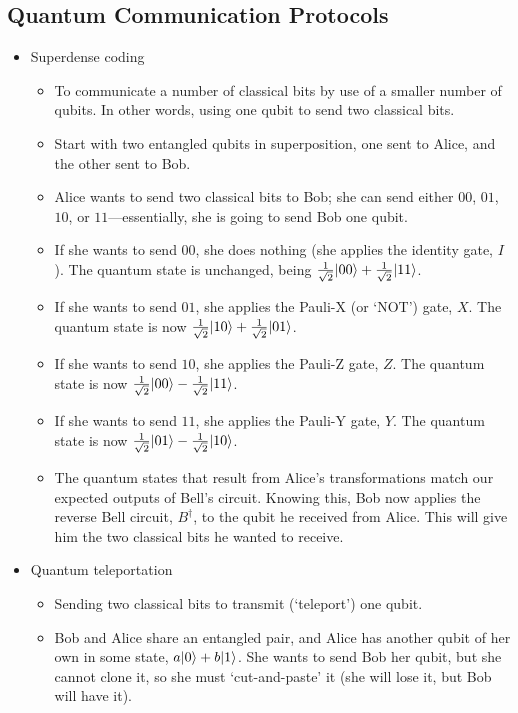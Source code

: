 \subsection{Quantum Communication Protocols}
\label{sub_sec:quantum_communication_protocols}
\begin{itemize}
    \item Superdense coding
        \begin{itemize}
            \item To communicate a number of classical bits by use of a smaller number of qubits. In other words, using one qubit to send two classical bits.
            \item Start with two entangled qubits in superposition, one sent to Alice, and the other sent to Bob.
            \item Alice wants to send two classical bits to Bob; she can send either $00$, $01$, $10$, or $11$---essentially, she is going to send Bob one qubit.
            \item If she wants to send $00$, she does nothing (she applies the identity gate, $I$). The quantum state is unchanged, being $\frac{1}{\sqrt{2}} \lvert00\rangle + \frac{1}{\sqrt{2}} \lvert11\rangle$.
            \item If she wants to send $01$, she applies the Pauli-X (or `NOT') gate, $X$. The quantum state is now $\frac{1}{\sqrt{2}} \lvert10\rangle + \frac{1}{\sqrt{2}} \lvert01\rangle$.
            \item If she wants to send $10$, she applies the Pauli-Z gate, $Z$. The quantum state is now $\frac{1}{\sqrt{2}} \lvert00\rangle - \frac{1}{\sqrt{2}} \lvert11\rangle$.
            \item If she wants to send $11$, she applies the Pauli-Y gate, $Y$. The quantum state is now $\frac{1}{\sqrt{2}} \lvert01\rangle - \frac{1}{\sqrt{2}} \lvert10\rangle$.
            \item The quantum states that result from Alice's transformations match our expected outputs of Bell's circuit. Knowing this, Bob now applies the reverse Bell circuit, $B^{\dagger}$, to the qubit he received from Alice. This will give him the two classical bits he wanted to receive.
        \end{itemize}
    \item Quantum teleportation
        \begin{itemize}
            \item Sending two classical bits to transmit (`teleport') one qubit.
            \item Bob and Alice share an entangled pair, and Alice has another qubit of her own in some state, $a \lvert0\rangle + b \lvert1\rangle$. She wants to send Bob her qubit, but she cannot clone it, so she must `cut-and-paste' it (she will lose it, but Bob will have it).

\end{itemize}
\end{itemize}
